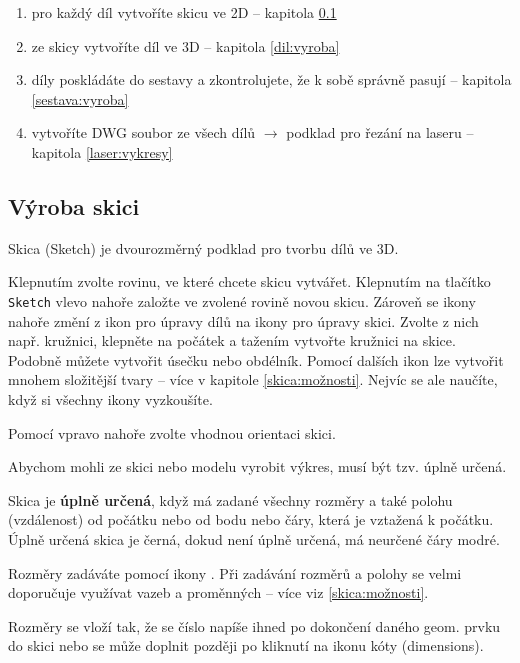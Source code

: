 \begin{enumerate}
	\item pro každý díl vytvoříte skicu ve 2D -- kapitola \ref{skica:vyroba}
	
	\item ze skicy vytvoříte díl ve 3D -- kapitola \ref{dil:vyroba}
	
	\item díly poskládáte do sestavy a zkontrolujete, že k sobě správně pasují -- kapitola \ref{sestava:vyroba}
	
	\item vytvoříte DWG soubor ze všech dílů $\rightarrow$ podklad pro řezání na laseru -- kapitola \ref{laser:vykresy}	
\end{enumerate}



\subsection{Výroba skici} \label{skica:vyroba}


Skica (Sketch)  je dvourozměrný podklad pro tvorbu dílů ve 3D. 

Klepnutím zvolte rovinu, ve které chcete skicu vytvářet. Klepnutím na tlačítko {\tt Sketch} vlevo nahoře založte ve zvolené rovině novou skicu. 
Zároveň se ikony nahoře změní z ikon pro úpravy dílů na ikony pro úpravy skici. 
Zvolte z nich např. kružnici, klepněte na počátek a tažením vytvořte kružnici na skice. 
Podobně můžete vytvořit úsečku nebo obdélník. 
Pomocí dalších ikon lze vytvořit mnohem složitější tvary -- více v kapitole \ref{skica:možnosti}.
Nejvíc se ale naučíte, když si všechny ikony vyzkoušíte. 

Pomocí  vpravo nahoře zvolte vhodnou orientaci skici. 

Abychom mohli ze skici nebo modelu vyrobit výkres, musí být tzv. úplně určená.

Skica je \textbf{úplně určená}, když má zadané všechny rozměry a také polohu (vzdálenost) od počátku nebo od bodu nebo čáry, která je vztažená k počátku.
Úplně určená skica je černá, dokud není úplně určená, má neurčené čáry modré.  

Rozměry zadáváte pomocí ikony .
Při zadávání rozměrů a polohy se velmi doporučuje využívat vazeb a proměnných -- více viz  \ref{skica:možnosti}.


Rozměry se vloží tak, že se číslo napíše ihned po dokončení daného geom. prvku do skici 
nebo se může doplnit později po kliknutí na ikonu kóty (dimensions).


